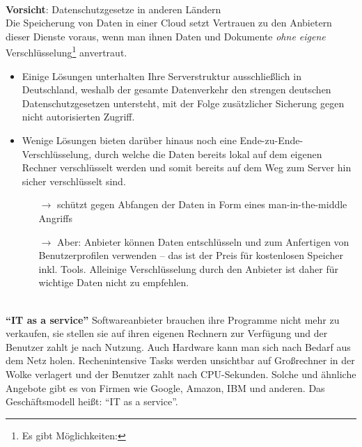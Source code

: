 ~\\
\textbf{Vorsicht}: Datenschutzgesetze in anderen Ländern\\
Die Speicherung von Daten in einer Cloud setzt Vertrauen zu den Anbietern dieser Dienste voraus, wenn man ihnen Daten und Dokumente \textit{ohne eigene} Verschlüsselung\footnote{Es gibt Möglichkeiten: } anvertraut.
\begin{itemize}
	\item Einige Lösungen unterhalten Ihre Serverstruktur ausschließlich in Deutschland, weshalb der gesamte Datenverkehr den strengen deutschen Datenschutzgesetzen untersteht, mit der Folge zusätzlicher Sicherung gegen nicht autorisierten Zugriff.
	\item Wenige Lösungen bieten darüber hinaus noch eine Ende-zu-Ende-Verschlüsselung, durch welche die Daten bereits lokal auf dem eigenen Rechner verschlüsselt werden und somit bereits auf dem Weg zum Server hin sicher verschlüsselt sind.
\begin{itemize}
	\item[$\to$] schützt gegen Abfangen der Daten in Form eines man-in-the-middle Angriffs
	\item[$\to$] Aber: Anbieter können Daten entschlüsseln und zum Anfertigen von Benutzerprofilen verwenden -- das ist der Preis für kostenlosen Speicher inkl. Tools. Alleinige Verschlüsselung durch den Anbieter ist daher für wichtige Daten nicht zu empfehlen.
\end{itemize}
\end{itemize}
~\\
\textbf{``IT as a service''}
Softwareanbieter brauchen ihre Programme nicht mehr zu verkaufen, sie stellen
sie auf ihren eigenen Rechnern zur Verfügung und der Benutzer zahlt je nach Nutzung. Auch Hardware kann man sich nach Bedarf aus dem Netz holen. Rechenintensive Tasks werden unsichtbar auf Großrechner in der Wolke verlagert und der Benutzer zahlt nach CPU-Sekunden. Solche und ähnliche Angebote gibt es von Firmen wie Google, Amazon, IBM und anderen. Das Geschäftsmodell heißt: ``IT as a service''.
%

